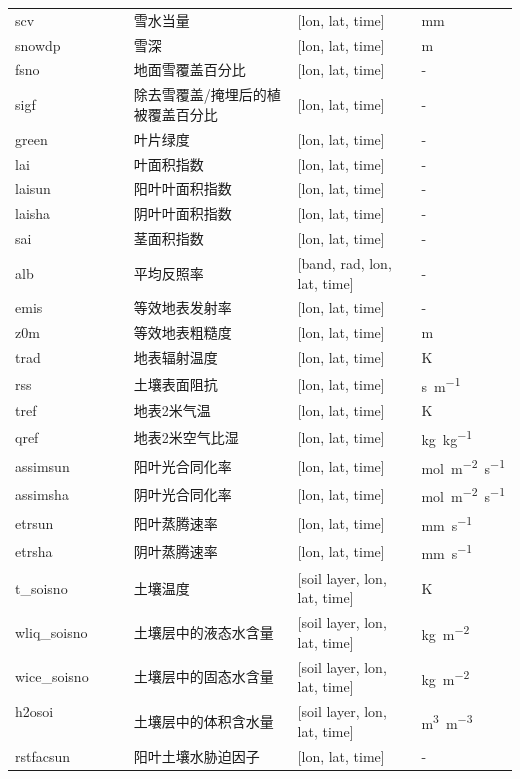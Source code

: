 \documentclass[a4paper,12pt,twoside]{article}
\begin{document}
{\begin{longtable}[htbp]{lp{}p{}l}
scv & 雪水当量 & {[}lon, lat, time{]}  & mm \\
snowdp & 雪深 & {[}lon, lat, time{]}  & m \\
fsno & 地面雪覆盖百分比 & {[}lon, lat, time{]}  & - \\
sigf & 除去雪覆盖/掩埋后的植被覆盖百分比 & {[}lon, lat, time{]}  & - \\
green & 叶片绿度 & {[}lon, lat, time{]}  & - \\
lai & 叶面积指数 & {[}lon, lat, time{]}  & - \\
laisun & 阳叶叶面积指数 & {[}lon, lat, time{]}  & - \\
laisha & 阴叶叶面积指数 & {[}lon, lat, time{]}  & - \\
sai & 茎面积指数 & {[}lon, lat, time{]}  & - \\
alb & 平均反照率 & {[}band, rad, lon, lat, time{]}  & - \\ %
emis & 等效地表发射率 & {[}lon, lat, time{]}  & - \\
z0m & 等效地表粗糙度 & {[}lon, lat, time{]}  & m \\
trad & 地表辐射温度 & {[}lon, lat, time{]}  & K \\
rss & 土壤表面阻抗 & {[}lon, lat, time{]} & \unit{s.m^{-1}}\\
tref & 地表2米气温 & {[}lon, lat, time{]}  & K \\
qref & 地表2米空气比湿 & {[}lon, lat, time{]}  & \unit{kg.kg^{-1}} \\
assimsun  & 阳叶光合同化率 & {[}lon, lat, time{]}  & \unit{mol.m^{-2}.s^{-1}} \\
assimsha  & 阴叶光合同化率 & {[}lon, lat, time{]}  & \unit{mol.m^{-2}.s^{-1}} \\
etrsun  & 阳叶蒸腾速率 & {[}lon, lat, time{]}  & \unit{mm.s^{-1}} \\
etrsha & 阴叶蒸腾速率 & {[}lon, lat, time{]}  & \unit{mm.s^{-1}} \\
t\_soisno ~ ~ ~ & 土壤温度 & {[}soil layer, lon, lat, time{]} & K \\
wliq\_soisno~ ~ & 土壤层中的液态水含量 & {[}soil layer, lon, lat, time{]} & \unit{kg.m^{-2}} \\
wice\_soisno~ ~ & 土壤层中的固态水含量& {[}soil layer, lon, lat, time{]} & \unit{kg.m^{-2}} \\
h2osoi ~ ~ ~ ~ ~ ~ ~ & 土壤层中的体积含水量 & {[}soil layer, lon, lat,
time{]}  & \unit{m^3.m^{-3}} \\
rstfacsun ~ ~ & 阳叶土壤水胁迫因子 & {[}lon, lat, time{]}  & - \\

\end{longtable}}
\end{document}
